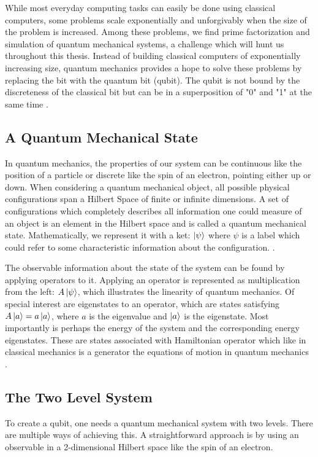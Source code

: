 While most everyday computing tasks can easily be done using classical computers, some problems scale exponentially and unforgivably when the size of the problem is increased. Among these problems, we find prime factorization and simulation of quantum mechanical systems, a challenge which will hunt us throughout this thesis. Instead of building classical computers of exponentially increasing size, quantum mechanics provides a hope to solve these problems by replacing the bit with the quantum bit (qubit). The qubit is not bound by the discreteness of the classical bit but can be in a superposition of "0" and "1" at the same time \cite{krantz_week_2019}.

\subsection{A Quantum Mechanical State}
In quantum mechanics, the properties of our system can be continuous like the position of a particle or discrete like the spin of an electron, pointing either up or down. When considering a quantum mechanical object, all possible physical configurations span a Hilbert Space of finite or infinite dimensions. A set of configurations which completely describes all information one could measure of an object is an element in the Hilbert space and is called a quantum mechanical state. Mathematically, we represent it with a ket: $\ket{\psi}$ where $\psi$ is a label which could refer to some characteristic information about the configuration. \cite{sakurai_modern_2021}.

The observable information about the state of the system can be found by applying operators to it. Applying an operator is represented as multiplication from the left: $A\ket{\psi}$, which illustrates the linearity of quantum mechanics. Of special interest are eigenstates to an operator, which are states satisfying $A\ket{a} = a \ket{a}$, where $a$ is the eigenvalue and $\ket{a}$ is the eigenstate. Most importantly is perhaps the energy of the system and the corresponding energy eigenstates. These are states associated with Hamiltonian operator which like in classical mechanics is a generator the equations of motion in quantum mechanics \cite{sakurai_modern_2021}.

\subsection{The Two Level System}\label{sec:tls}
To create a qubit, one needs a quantum mechanical system with two levels. There are multiple ways of achieving this. A straightforward approach is by using an observable in a 2-dimensional Hilbert space like the spin of an electron.  

